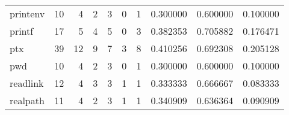\begin{tabular}{lrrrrrrrrr}
printenv  &                                      10 &                                                  4 &                                                  2 &                                                  3 &                                                  0 &                                                  1 &                                           0.300000 &                               0.600000 &                             0.100000 \\
printf    &                                      17 &                                                  5 &                                                  4 &                                                  5 &                                                  0 &                                                  3 &                                           0.382353 &                               0.705882 &                             0.176471 \\
ptx       &                                      39 &                                                 12 &                                                  9 &                                                  7 &                                                  3 &                                                  8 &                                           0.410256 &                               0.692308 &                             0.205128 \\
pwd       &                                      10 &                                                  4 &                                                  2 &                                                  3 &                                                  0 &                                                  1 &                                           0.300000 &                               0.600000 &                             0.100000 \\
readlink  &                                      12 &                                                  4 &                                                  3 &                                                  3 &                                                  1 &                                                  1 &                                           0.333333 &                               0.666667 &                             0.083333 \\
realpath  &                                      11 &                                                  4 &                                                  2 &                                                  3 &                                                  1 &                                                  1 &                                           0.340909 &                               0.636364 &                             0.090909 \\

\end{tabular}

